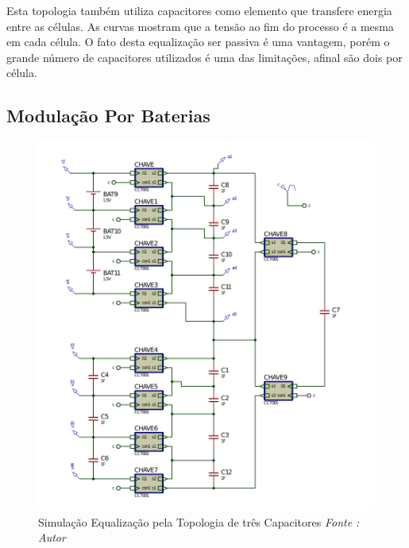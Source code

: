 \documentclass[11pt, a4paper, oneside]{article}
\begin{document}
Esta topologia também utiliza capacitores como elemento que transfere
energia entre as células. As curvas mostram que a tensão ao fim do processo é a
mesma em cada célula. O fato desta equalização ser passiva é uma vantagem,
porém o grande número de capacitores utilizados é uma das limitações, afinal são
dois por célula.

\newpage

\subsection{Modulação Por Baterias}

\begin{figure}[h!]
\centering
\includegraphics[width=1\linewidth]{ETC_Diversos_capacitores}
\caption{Simulação Equalização pela Topologia de três Capacitores \textit{Fonte : Autor}}
\label{fig:estrutura_equalizador_passivo_ apacitor}
\end{figure}
\end{document}

